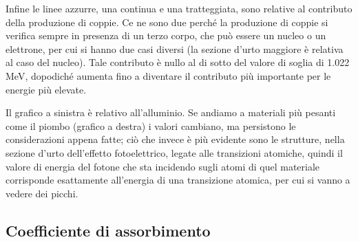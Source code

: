 \begin{esempio}
    Infine le linee azzurre, una continua e una tratteggiata, sono relative al contributo della produzione di coppie. Ce ne sono due perché la produzione di coppie si verifica sempre in presenza di un terzo corpo, che può essere un nucleo o un elettrone, per cui si hanno due casi diversi (la sezione d'urto maggiore è relativa al caso del nucleo). Tale contributo è nullo al di sotto del valore di soglia di 1.022 MeV, dopodiché aumenta fino a diventare il contributo più importante per le energie più elevate.

    Il grafico a sinistra è relativo all'alluminio. Se andiamo a materiali più pesanti come il piombo (grafico a destra) i valori cambiano, ma persistono le considerazioni appena fatte; ciò che invece è più evidente sono le strutture, nella sezione d'urto dell'effetto fotoelettrico, legate alle transizioni atomiche, quindi il valore di energia del fotone che sta incidendo sugli atomi di quel materiale corrisponde esattamente all'energia di una transizione atomica, per cui si vanno a vedere dei picchi.
\end{esempio}


\subsection{Coefficiente di assorbimento}

